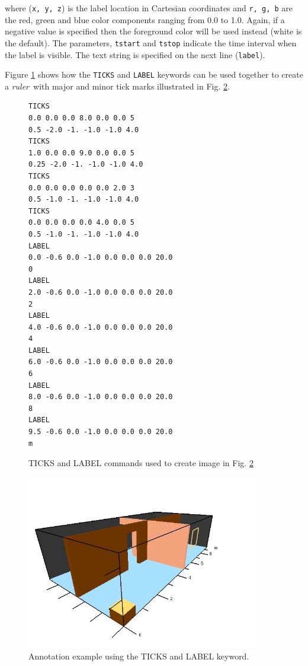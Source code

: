 \documentclass[11pt,twoside]{book}
\begin{document}
\noindent where ({\tt x, y, z}) is the label location in Cartesian
coordinates and {\tt r, g, b} are the red, green and blue color
components ranging from 0.0 to 1.0.  Again, if a negative value is
specified then the foreground color will be used instead (white is
the default).  The parameters, {\tt tstart} and {\tt tstop}
indicate the time interval when the label is visible. The text
string is specified on the next line ({\tt label}).

Figure \ref{figticklabels} shows how the {\tt TICKS} and
{\tt LABEL} keywords can be used together to create a
{\em ruler}\ with major and minor tick marks illustrated in Fig.
\ref{figticklabelexample}.

\begin{figure}[\figoptions]
{\small
\begin{lstlisting}
TICKS
0.0 0.0 0.0 8.0 0.0 0.0 5
0.5 -2.0 -1. -1.0 -1.0 4.0
TICKS
1.0 0.0 0.0 9.0 0.0 0.0 5
0.25 -2.0 -1. -1.0 -1.0 4.0
TICKS
0.0 0.0 0.0 0.0 0.0 2.0 3
0.5 -1.0 -1. -1.0 -1.0 4.0
TICKS
0.0 0.0 0.0 0.0 4.0 0.0 5
0.5 -1.0 -1. -1.0 -1.0 4.0
LABEL
0.0 -0.6 0.0 -1.0 0.0 0.0 0.0 20.0
0
LABEL
2.0 -0.6 0.0 -1.0 0.0 0.0 0.0 20.0
2
LABEL
4.0 -0.6 0.0 -1.0 0.0 0.0 0.0 20.0
4
LABEL
6.0 -0.6 0.0 -1.0 0.0 0.0 0.0 20.0
6
LABEL
8.0 -0.6 0.0 -1.0 0.0 0.0 0.0 20.0
8
LABEL
9.5 -0.6 0.0 -1.0 0.0 0.0 0.0 20.0
m
\end{lstlisting}
}
\caption{ TICKS and LABEL commands used to create image in Fig. \ref{figticklabelexample}}
\label{figticklabels}%
\end{figure}

\begin{figure}[\figoptions]
\begin{center}
\includegraphics[height=3.0in]{FIGURES/ticklabels}
\end{center}
\caption{ Annotation example using the TICKS and LABEL keyword. }
\label{figticklabelexample}%
\end{figure}
\end{document}
